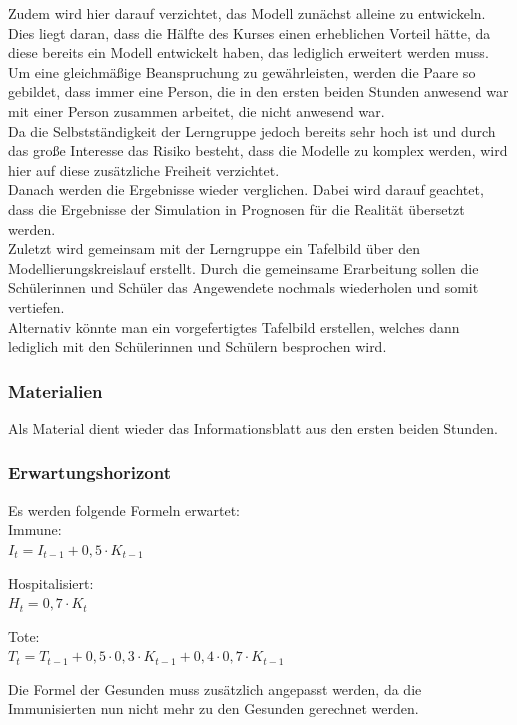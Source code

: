 Zudem wird hier darauf verzichtet, das Modell zunächst alleine zu entwickeln. Dies liegt daran, dass die Hälfte des Kurses einen erheblichen Vorteil hätte, da diese bereits ein Modell entwickelt haben, das lediglich erweitert werden muss. Um eine gleichmäßige Beanspruchung zu gewährleisten, werden die Paare so gebildet, dass immer eine Person, die in den ersten beiden Stunden anwesend war mit einer Person zusammen arbeitet, die nicht anwesend war.\\
Da die Selbstständigkeit der Lerngruppe jedoch bereits sehr hoch ist und durch das große Interesse das Risiko besteht, dass die Modelle zu komplex werden, wird hier auf diese zusätzliche Freiheit verzichtet.\\
Danach werden die Ergebnisse wieder verglichen. Dabei wird darauf geachtet, dass die Ergebnisse der Simulation in Prognosen für die Realität übersetzt werden.\\
Zuletzt wird gemeinsam mit der Lerngruppe ein Tafelbild über den Modellierungskreislauf erstellt. Durch die gemeinsame Erarbeitung sollen die Schülerinnen und Schüler das Angewendete nochmals wiederholen und somit vertiefen.\\
Alternativ könnte man ein vorgefertigtes Tafelbild erstellen, welches dann lediglich mit den Schülerinnen und Schülern besprochen wird.


\subsubsection*{Materialien}
Als Material dient wieder das Informationsblatt aus den ersten beiden Stunden.
\subsubsection*{Erwartungshorizont}
Es werden folgende Formeln erwartet:\\
Immune:\\
$ I_t = I_{t-1} + 0,5 \cdot K_{t-1}$

Hospitalisiert:\\
$ H_t = 0,7 \cdot K_t$

Tote:\\
$ T_t = T_{t-1}+0,5 \cdot 0,3 \cdot K_{t-1}+0,4 \cdot 0,7 \cdot K_{t-1}$
 
Die Formel der Gesunden muss zusätzlich angepasst werden, da die Immunisierten nun nicht mehr zu den Gesunden gerechnet werden.


